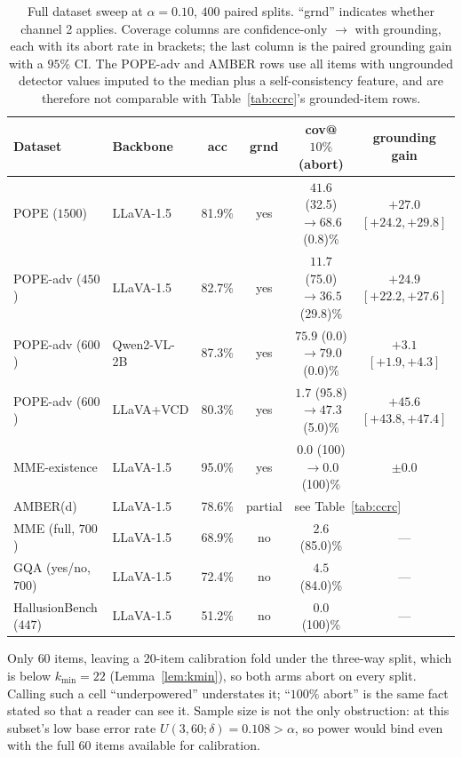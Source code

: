 \documentclass{article}
\theoremstyle{plain}
\theoremstyle{definition}
\theoremstyle{remark}
\begin{document}
\begin{table}[t]
\centering
\begin{threeparttable}
\caption{Full dataset sweep at $\alpha=0.10$, $400$ paired splits. ``grnd'' indicates whether
channel 2 applies. Coverage columns are confidence-only $\to$ with grounding, each with its
abort rate in brackets; the last column is the paired grounding gain with a $95\%$ CI. The
POPE-adv and AMBER rows use all items with ungrounded detector values imputed to the median plus
a self-consistency feature, and are therefore not comparable with Table~\ref{tab:ccrc}'s
grounded-item rows.}
\label{tab:datasets}
\small
\begin{tabular}{llcccc}
\toprule
Dataset & Backbone & acc & grnd & cov@$10\%$ (abort) & grounding gain\\
\midrule
POPE ($1500$)     & LLaVA-1.5   & 81.9\% & yes & $41.6$ (32.5) $\to\mathbf{68.6}$ (0.8)\% & $+27.0$ $[+24.2,+29.8]$\\
POPE-adv ($450$)  & LLaVA-1.5   & 82.7\% & yes & $11.7$ (75.0) $\to\mathbf{36.5}$ (29.8)\% & $+24.9$ $[+22.2,+27.6]$\\
POPE-adv ($600$)  & Qwen2-VL-2B & 87.3\% & yes & $75.9$ (0.0) $\to\mathbf{79.0}$ (0.0)\% & $+3.1$ $[+1.9,+4.3]$\\
POPE-adv ($600$)  & LLaVA+VCD   & 80.3\% & yes & $1.7$ (95.8) $\to\mathbf{47.3}$ (5.0)\% & $+45.6$ $[+43.8,+47.4]$\\
MME-existence\tnote{a} & LLaVA-1.5 & 95.0\% & yes & $0.0$ (100) $\to0.0$ (100)\% & $\pm0.0$\\
AMBER(d)          & LLaVA-1.5   & 78.6\% & partial & \multicolumn{2}{l}{see Table~\ref{tab:ccrc}}\\
MME (full, $700$) & LLaVA-1.5   & 68.9\% & no  & $2.6$ (85.0)\% & ---\\
GQA (yes/no, $700$)& LLaVA-1.5  & 72.4\% & no  & $4.5$ (84.0)\% & ---\\
HallusionBench ($447$) & LLaVA-1.5 & 51.2\% & no & $0.0$ (100)\% & ---\\
\bottomrule
\end{tabular}
\begin{tablenotes}
\item[a] Only $60$ items, leaving a $20$-item calibration fold under the three-way split,
which is below $k_{\min}=22$ (Lemma~\ref{lem:kmin}), so both arms abort on every split. Calling
such a cell ``underpowered'' understates it; ``$100\%$ abort'' is the same fact stated so that a
reader can see it. Sample size is not the only obstruction: at this subset's
low base error rate $U(3,60;\delta)=0.108>\alpha$, so power would bind even with the full
$60$ items available for calibration.
\end{tablenotes}
\end{threeparttable}
\end{table}
\end{document}
